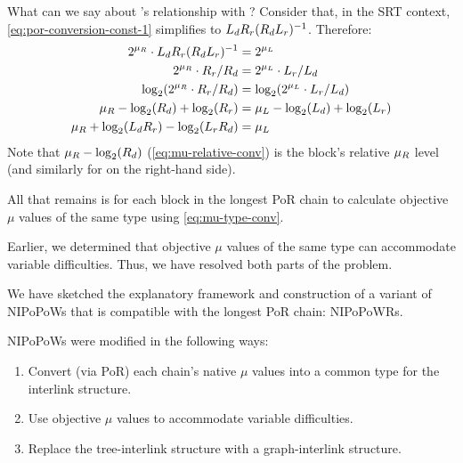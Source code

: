 What can we say about \muType\cR's relationship with \muType\cL?
Consider that, in the SRT context, \autoref{eq:por-conversion-const-1} simplifies to $L_d R_r (R_d L_r)^{-1}$.
Therefore:
\begin{align}
    2^{\mu_{R}} \cdot L_d R_r (R_d L_r)^{-1} &= 2^{\mu_{L}} \nonumber \\
    2^{\mu_{R}} \cdot R_r / R_d &= 2^{\mu_{L}} \cdot L_r/L_d \nonumber \\
    \log_2(2^{\mu_{R}} \cdot R_r / R_d) &= \log_2(2^{\mu_{L}} \cdot L_r/L_d) \nonumber \\
    \mu_{R} - \log_2(R_d) + \log_2(R_r) &= \mu_{L} - \log_2(L_d) + \log_2(L_r)
    \label{eq:mu-relative-conv} \\
    \mu_{R} + \log_2(L_d R_r) - \log_2(L_r R_d) &= \mu_{L}
    \label{eq:mu-type-conv}
\end{align}
Note that $\mu_{R} - \log_2(R_d)$ (\autoref{eq:mu-relative-conv}) is the block's relative $\mu_{R}$ level (and similarly for \muType\cL on the right-hand side).

All that remains is for each block in the longest PoR chain to calculate objective $\mu$ values of the same type using \autoref{eq:mu-type-conv}.

Earlier, we determined that objective $\mu$ values of the same type can accommodate variable difficulties.
Thus, we have resolved both parts of the problem.


We have sketched the explanatory framework and construction of a variant of NIPoPoWs that is compatible with the longest PoR chain: NIPoPoWRs.

NIPoPoWs were modified in the following ways:
\begin{enumerate}
    \item Convert (via PoR) each chain's native $\mu$ values into a common type for the interlink structure.
    \item Use objective $\mu$ values to accommodate variable difficulties.
    \item Replace the tree-interlink structure with a graph-interlink structure.
\end{enumerate}

